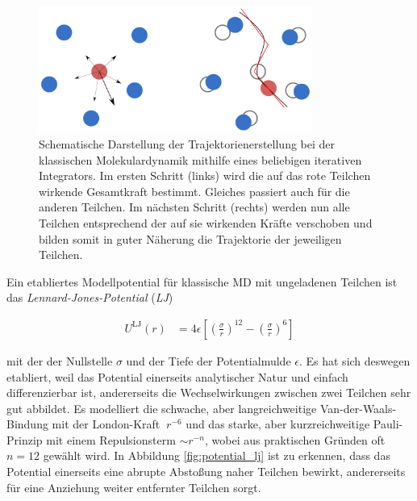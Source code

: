 		\begin{figure}[!ht]
			\centering
			\includegraphics[width=0.8\textwidth]{chapter/main/theory/img/scheme_md.png}
			\caption{Schematische Darstellung der Trajektorienerstellung bei der klassischen
			Molekulardynamik mithilfe eines beliebigen iterativen Integrators. Im ersten Schritt
			(links) wird die auf das rote Teilchen wirkende Gesamtkraft bestimmt. Gleiches
			passiert auch für die anderen Teilchen. Im nächsten Schritt (rechts) werden nun alle
			Teilchen entsprechend der auf sie wirkenden Kräfte verschoben und bilden somit in
			guter Näherung die Trajektorie der jeweiligen Teilchen.
			\cite{sonntag2011computer}}
			\label{fig:scheme_md}
		\end{figure}

		Ein etabliertes Modellpotential für klassische MD mit ungeladenen Teilchen ist das
		\emph{Lennard-Jones-Potential} (\emph{LJ})

		\begin{align}
			U^\text{LJ}(r) &= 4\epsilon \left[
				\left(\frac{\sigma}{r}\right)^{12}
				-
				\left(\frac{\sigma}{r}\right)^{6}
			\right]
			\label{eq:potential_lj}
		\end{align}

		mit der der Nullstelle $\sigma$ und der Tiefe der Potentialmulde $\epsilon$. Es hat sich
		deswegen etabliert, weil das Potential einerseits analytischer Natur und einfach
		differenzierbar ist, andererseits die Wechselwirkungen zwischen zwei Teilchen sehr gut
		abbildet. Es modelliert die schwache, aber langreichweitige Van-der-Waals-Bindung mit der
		London-Kraft $~ r^{-6}$ und das starke, aber kurzreichweitige Pauli-Prinzip mit einem
		Repulsionsterm $\sim r^{-n}$, wobei aus praktischen Gründen oft $n=12$ gewählt wird. In
		Abbildung \ref{fig:potential_lj} ist zu erkennen, dass das Potential einerseits eine
		abrupte Abstoßung naher Teilchen bewirkt, andererseits für eine Anziehung weiter
		entfernter Teilchen sorgt.

